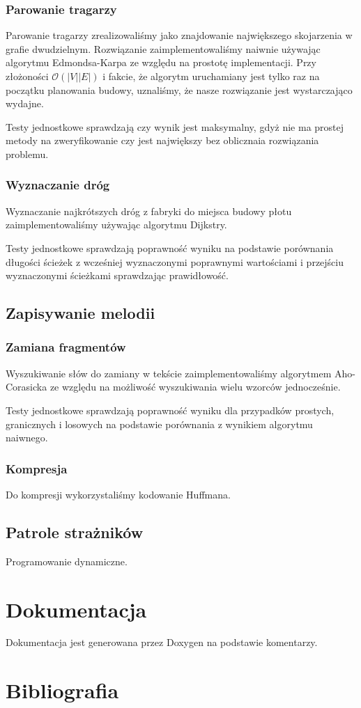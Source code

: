 \documentclass{article}
\begin{document}
\subsubsection{Parowanie tragarzy}
Parowanie tragarzy zrealizowaliśmy jako znajdowanie największego skojarzenia w grafie dwudzielnym.
Rozwiązanie zaimplementowaliśmy naiwnie używając algorytmu Edmondsa-Karpa ze względu na prostotę implementacji.
Przy złożoności \(\mathcal{O}(|V||E|)\)\cite{cs6820matchingnotes}
i fakcie, że algorytm uruchamiany jest tylko raz na początku planowania budowy,
uznaliśmy, że nasze rozwiązanie jest wystarczająco wydajne.

\noindent Testy jednostkowe sprawdzają czy wynik jest maksymalny,
gdyż nie ma prostej metody na zweryfikowanie czy jest największy
bez oblicznaia rozwiązania problemu.
\subsubsection{Wyznaczanie dróg}
Wyznaczanie najkrótszych dróg z fabryki do miejsca budowy płotu zaimplementowaliśmy używając algorytmu Dijkstry.

\noindent Testy jednostkowe sprawdzają poprawność wyniku
na podstawie porównania długości ścieżek z wcześniej wyznaczonymi poprawnymi wartościami
i przejściu wyznaczonymi ścieżkami sprawdzając prawidłowość.

\subsection{Zapisywanie melodii}
\subsubsection{Zamiana fragmentów}
Wyszukiwanie słów do zamiany w tekście zaimplementowaliśmy algorytmem Aho-Corasicka
ze względu na możliwość wyszukiwania wielu wzorców jednocześnie.

\noindent Testy jednostkowe sprawdzają poprawność wyniku
dla przypadków prostych, granicznych i losowych na podstawie porównania
z wynikiem algorytmu naiwnego.
\subsubsection{Kompresja}
Do kompresji wykorzystaliśmy kodowanie Huffmana.

\subsection{Patrole strażników}
Programowanie dynamiczne.

\section{Dokumentacja}
Dokumentacja jest generowana przez Doxygen na podstawie komentarzy.

\section{Bibliografia}
\printbibliography[heading=bibintoc]
\end{document}
